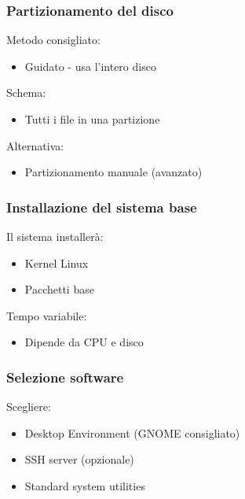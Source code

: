 \documentclass{beamer}
\begin{document}
	
	\begin{frame}
		\frametitle{Partizionamento del disco}
		
		Metodo consigliato:
		
		\begin{itemize}
			\item Guidato - usa l'intero disco
		\end{itemize}
		
		Schema:
		\begin{itemize}
			\item Tutti i file in una partizione
		\end{itemize}
		
		Alternativa:
		\begin{itemize}
			\item Partizionamento manuale (avanzato)
		\end{itemize}
		
	\end{frame}
	
	
	\begin{frame}
		\frametitle{Installazione del sistema base}
		
		Il sistema installerà:
		\begin{itemize}
			\item Kernel Linux
			\item Pacchetti base
		\end{itemize}
		
		Tempo variabile:
		\begin{itemize}
			\item Dipende da CPU e disco
		\end{itemize}
		
	\end{frame}
	
	
	\begin{frame}
		\frametitle{Selezione software}
		
		Scegliere:
		\begin{itemize}
			\item Desktop Environment (GNOME consigliato)
			\item SSH server (opzionale)
			\item Standard system utilities
		\end{itemize}
		
	\end{frame}
	
\end{document}
